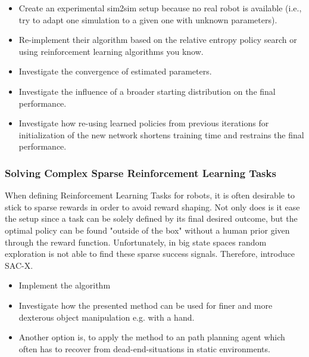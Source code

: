 \documentclass[a4paper]{article}
\begin{document}
\begin{itemize}
  \item Create an experimental sim2sim setup because no real robot is available (i.e., try to adapt one simulation to a given one with unknown parameters).
  \item Re-implement their algorithm based on the relative entropy policy search or using reinforcement learning algorithms you know.
  \item Investigate the convergence of estimated parameters.
  \item Investigate the influence of a broader starting distribution on the final performance.
  \item Investigate how re-using learned policies from previous iterations for initialization of the new network shortens training time and restrains the final performance.
\end{itemize}


\subsubsection{Solving Complex Sparse Reinforcement Learning Tasks}
When defining Reinforcement Learning Tasks for robots, it is often desirable to stick to sparse rewards in order to avoid reward shaping. Not only does is it ease the setup since a task can be solely defined by its final desired outcome, but the optimal policy can be found "outside of the box" without a human prior given through the reward function. Unfortunately, in big state spaces random exploration is not able to find these sparse success signals. Therefore, \cite{riedmiller2018} introduce SAC-X.
\begin{itemize}
  \item Implement the algorithm
  \item Investigate how the presented method can be used for finer and more dexterous object manipulation e.g. with a hand.
  \item Another option is, to apply the method to an path planning agent which often has to recover from dead-end-situations in static environments.
\end{itemize}
\end{document}
